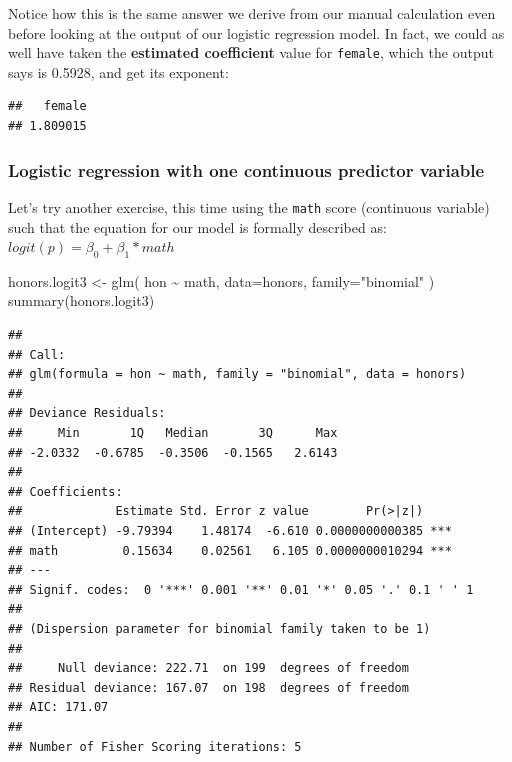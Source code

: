 \documentclass[
]{article}
\newenvironment{Shaded}{\begin{snugshade}}{\end{snugshade}}
\newcommand{\AttributeTok}[1]{\textcolor[rgb]{0.77,0.63,0.00}{#1}}
\newcommand{\FunctionTok}[1]{\textcolor[rgb]{0.00,0.00,0.00}{#1}}
\newcommand{\NormalTok}[1]{#1}
\newcommand{\OtherTok}[1]{\textcolor[rgb]{0.56,0.35,0.01}{#1}}
\newcommand{\SpecialCharTok}[1]{\textcolor[rgb]{0.00,0.00,0.00}{#1}}
\newcommand{\StringTok}[1]{\textcolor[rgb]{0.31,0.60,0.02}{#1}}
\begin{document}
Notice how this is the same answer we derive from our manual calculation
even before looking at the output of our logistic regression model. In
fact, we could as well have taken the \textbf{estimated coefficient}
value for \texttt{female}, which the output says is 0.5928, and get its
exponent:

\begin{Shaded}
\end{Shaded}

\begin{verbatim}
##   female 
## 1.809015
\end{verbatim}

\hypertarget{logistic-regression-with-one-continuous-predictor-variable}{%
\subsubsection{Logistic regression with one continuous predictor
variable}\label{logistic-regression-with-one-continuous-predictor-variable}}

Let's try another exercise, this time using the \texttt{math} score
(continuous variable) such that the equation for our model is formally
described as: \(logit(p) = \beta_0 + \beta_1 * math\)

\begin{Shaded}
\begin{Highlighting}[]
\NormalTok{honors.logit3 }\OtherTok{\textless{}{-}} \FunctionTok{glm}\NormalTok{( hon }\SpecialCharTok{\textasciitilde{}}\NormalTok{ math, }\AttributeTok{data=}\NormalTok{honors, }\AttributeTok{family=}\StringTok{"binomial"}\NormalTok{ )}
\FunctionTok{summary}\NormalTok{(honors.logit3)}
\end{Highlighting}
\end{Shaded}

\begin{verbatim}
## 
## Call:
## glm(formula = hon ~ math, family = "binomial", data = honors)
## 
## Deviance Residuals: 
##     Min       1Q   Median       3Q      Max  
## -2.0332  -0.6785  -0.3506  -0.1565   2.6143  
## 
## Coefficients:
##             Estimate Std. Error z value        Pr(>|z|)    
## (Intercept) -9.79394    1.48174  -6.610 0.0000000000385 ***
## math         0.15634    0.02561   6.105 0.0000000010294 ***
## ---
## Signif. codes:  0 '***' 0.001 '**' 0.01 '*' 0.05 '.' 0.1 ' ' 1
## 
## (Dispersion parameter for binomial family taken to be 1)
## 
##     Null deviance: 222.71  on 199  degrees of freedom
## Residual deviance: 167.07  on 198  degrees of freedom
## AIC: 171.07
## 
## Number of Fisher Scoring iterations: 5
\end{verbatim}
\end{document}
